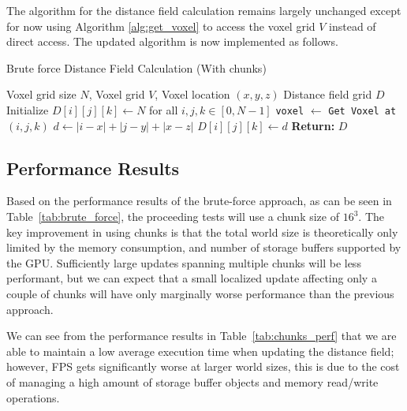 The algorithm for the distance field calculation remains largely unchanged except for now using Algorithm
\ref{alg:get_voxel} to access the voxel grid \(V\) instead of direct access. The updated algorithm is now implemented
as follows.

\begin{algorithm}[H]
    \caption{Brute force Distance Field Calculation (With chunks)}
    \begin{algorithmic}[1]
        \REQUIRE Voxel grid size \(N\), Voxel grid \(V\), Voxel location \((x, y, z)\)
        \ENSURE Distance field grid \(D\)
        \STATE Initialize \(D[i][j][k] \gets N\) for all \(i, j, k \in [0, N-1]\)
        \STATE \texttt{voxel} $\gets$ \texttt{Get Voxel at} \((i, j, k)\)
        \STATE \(d \gets |i - x| + |j - y| + |x - z|\)
        \STATE \(D[i][j][k] \gets d\)
        \ENDIF
        \ENDIF
        \ENDFOR
        \ENDFOR
        \ENDFOR
        \STATE \textbf{Return:} \(D\)
    \end{algorithmic}
\end{algorithm}

\subsection{Performance Results}
Based on the performance results of the brute-force approach, as can be seen in Table~\ref{tab:brute_force}, the
proceeding tests will use a chunk size of \(16^3\). The key improvement in using chunks is that the total world size is
theoretically only limited by the memory consumption, and number of storage buffers supported by the GPU. Sufficiently
large updates spanning multiple chunks will be less performant, but we can expect that a small localized update
affecting only a couple of chunks will have only marginally worse performance than the previous approach.

We can see from the performance results in Table~\ref{tab:chunks_perf} that we are able to maintain a low average
execution time when updating the distance field; however, FPS gets significantly worse at larger world sizes, this is
due to the cost of managing a high amount of storage buffer objects and memory read/write operations.

